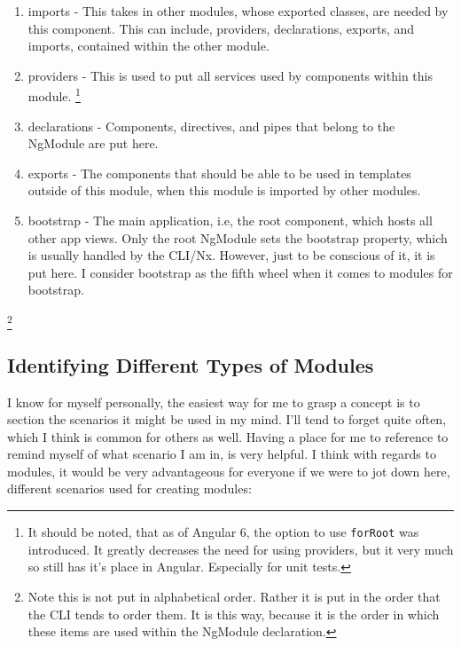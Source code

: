 \begin{enumerate}
  \item imports - This takes in other modules, whose exported classes, are
  needed by this component. This can include, providers, declarations, exports,
  and imports, contained within the other module.
  \item providers - This is used to put all services used by components within
  this module. \footnote{It should be noted, that as of Angular 6, the option
  to use \lstinline{forRoot} was introduced. It greatly decreases the need for
  using providers, but it very much so still has it's place in Angular.
  Especially for unit tests.}
  \item declarations - Components, directives, and pipes that belong to the
  NgModule are put here.
  \item exports - The components that should be able to be used in templates
  outside of this module, when this module is imported by other modules.
  \item bootstrap - The main application, i.e, the root component, which hosts
  all other app views. Only the root NgModule sets the bootstrap property,
  which is usually handled by the CLI/Nx. However, just to be conscious of it,
  it is put here. I consider bootstrap as the fifth wheel when it comes to
  modules for bootstrap.
\end{enumerate}
\footnote{Note this is not put in alphabetical order. Rather it is put in the
order that the CLI tends to order them. It is this way, because it is the order
in which these items are used within the NgModule declaration.}

\subsection{Identifying Different Types of Modules}
I know for myself personally, the easiest way for me to grasp a concept is to
section the scenarios it might be used in my mind. I'll tend to forget quite
often, which I think is common for others as well. Having a place for me to
reference to remind myself of what scenario I am in, is very helpful. I think
with regards to modules, it would be very advantageous for everyone if we were
to jot down here, different scenarios used for creating modules:
